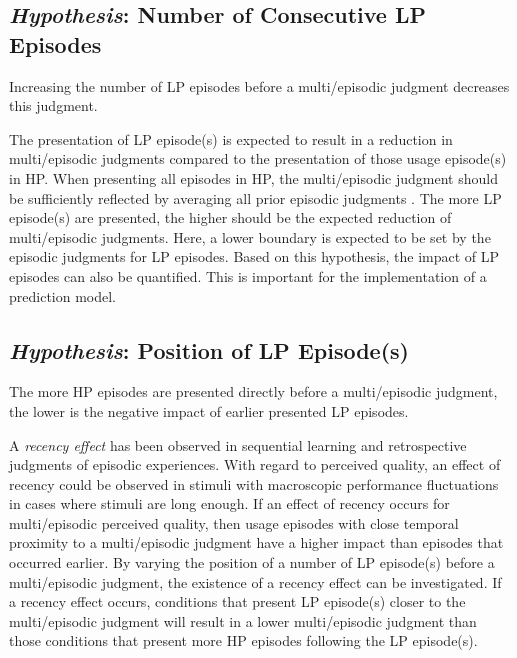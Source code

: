\subsection[H1: Number of Consecutive \acs{LP} Episodes]{\emph{Hypothesis}: Number of Consecutive \acs{LP} Episodes}
\begin{hypothesis}\label{hypo:number}
Increasing the number of \ac{LP} episodes before a multi\-/episodic judgment decreases this judgment.
\end{hypothesis}

The presentation of \ac{LP} episode(s) is expected to result in a reduction in multi\-/episodic judgments compared to the presentation of those usage episode(s) in \ac{HP}.
When presenting all episodes in \ac{HP}, the multi\-/episodic judgment should be sufficiently reflected by averaging all prior episodic judgments \citep[\cf,][]{moller_single-call_2011}.
The more \ac{LP} episode(s) are presented, the higher should be the expected reduction of multi\-/episodic judgments.
Here, a lower boundary is expected to be set by the episodic judgments for \ac{LP} episodes.
Based on this hypothesis, the impact of \ac{LP} episodes can also be quantified.
This is important for the implementation of a prediction model.


\subsection[H2: Position of \acs{LP} Episode(s)]{\emph{Hypothesis}: Position of \acs{LP} Episode(s)}
\begin{hypothesis}\label{hypo:position}
The more \ac{HP} episodes are presented directly before a multi\-/episodic judgment, the lower is the negative impact of earlier presented \ac{LP} episodes.
\end{hypothesis}

A \emph{recency effect} has been observed in sequential learning and retrospective judgments of episodic experiences.
With regard to perceived quality, an effect of recency could be observed in stimuli with macroscopic performance fluctuations in cases where stimuli are long enough.
If an effect of recency occurs for multi\-/episodic perceived quality, then usage episodes with close temporal proximity to a multi\-/episodic judgment have a higher impact than episodes that occurred earlier.
By varying the position of a number of \ac{LP} episode(s) before a multi\-/episodic judgment, the existence of a recency effect can be investigated.
If a recency effect occurs, conditions that present \ac{LP} episode(s) closer to the multi\-/episodic judgment will result in a lower multi\-/episodic judgment than those conditions that present more \ac{HP} episodes following the \ac{LP} episode(s).

